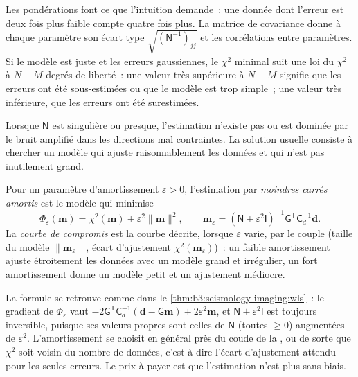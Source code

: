 Les pondérations font ce que l'intuition demande~: une donnée dont l'erreur est
deux fois plus faible compte quatre fois plus. La matrice de covariance donne à chaque paramètre son écart type
$\sqrt{(\mathsf N^{-1})_{jj}}$ et les corrélations entre paramètres. Si le modèle
est juste et les erreurs gaussiennes, le $\chi^2$ minimal suit une loi du $\chi^2$
à $N - M$ degrés de liberté~: une valeur très supérieure à $N - M$ signifie que les erreurs
ont été sous-estimées ou que le modèle est trop simple~; une valeur très inférieure, que les
erreurs ont été surestimées.

Lorsque $\mathsf N$ est singulière ou presque, l'estimation n'existe pas ou est
dominée par le bruit amplifié dans les directions mal contraintes. La solution
usuelle consiste à chercher un modèle qui ajuste raisonnablement les données et
qui n'est pas inutilement grand.

\begin{definition}\label{def:b3:seismology-imaging:damped}
Pour un paramètre d'amortissement $\varepsilon > 0$, l'estimation par \emph{moindres carrés
amortis} est le modèle qui minimise
\[
  \Phi_\varepsilon(\mathbf m) = \chi^2(\mathbf m) + \varepsilon^2\|\mathbf m\|^2 ,
  \qquad
  \mathbf m_\varepsilon = \left(\mathsf N + \varepsilon^2\mathsf I\right)^{-1}
  \mathsf G^{\mathsf T}\mathsf C_d^{-1}\mathbf d .
\]
La \emph{courbe de compromis} est la courbe décrite, lorsque
$\varepsilon$ varie, par le couple (taille du modèle $\|\mathbf m_\varepsilon\|$,
écart d'ajustement $\chi^2(\mathbf m_\varepsilon)$)~: un faible amortissement ajuste étroitement les données
avec un modèle grand et irrégulier, un fort amortissement donne un modèle petit et un ajustement médiocre.
\end{definition}

La formule se retrouve comme dans le \cref{thm:b3:seismology-imaging:wls}~: le gradient
de $\Phi_\varepsilon$ vaut $-2\mathsf G^{\mathsf T}\mathsf C_d^{-1}(\mathbf d -
\mathsf G\mathbf m) + 2\varepsilon^2\mathbf m$, et $\mathsf N + \varepsilon^2
\mathsf I$ est toujours inversible, puisque ses valeurs propres sont celles de
$\mathsf N$ (toutes $\ge 0$) augmentées de $\varepsilon^2$. L'amortissement se choisit en général
près du coude de la , ou de sorte que $\chi^2$ soit voisin du
nombre de données, c'est-à-dire l'écart d'ajustement attendu pour les seules erreurs. Le prix
à payer est que l'estimation n'est plus sans biais.

